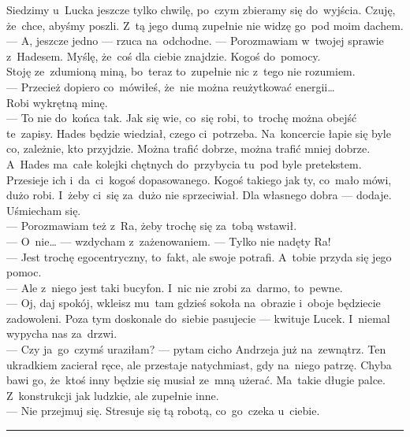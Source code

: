 \documentclass[9pt, a5paper]{memoir}
\begin{document}
Siedzimy u~Lucka jeszcze tylko chwilę, po~czym zbieramy się do~wyjścia. Czuję, że~chce, abyśmy poszli. Z~tą jego dumą zupełnie nie widzę go~pod moim dachem.\\
--- A, jeszcze jedno --- rzuca na~odchodne. --- Porozmawiam w~twojej sprawie z~Hadesem. Myślę, że~coś dla ciebie znajdzie. Kogoś do~pomocy.\\
Stoję ze~zdumioną miną, bo~teraz to~zupełnie nic z~tego nie rozumiem.\\
--- Przecież dopiero co~mówiłeś, że~nie można reużytkować energii\dots\\
Robi wykrętną minę.\\
--- To nie do~końca tak. Jak się wie, co~się robi, to~trochę można obejść te~zapisy. Hades będzie wiedział, czego ci~potrzeba. Na~koncercie łapie się byle co, zależnie, kto przyjdzie. Można trafić dobrze, można trafić mniej dobrze. A~Hades ma~całe kolejki chętnych do~przybycia tu~pod byle pretekstem. Przesieje ich i~da~ci~kogoś dopasowanego. Kogoś takiego jak ty, co~mało mówi, dużo robi. I~żeby ci~się za~dużo nie sprzeciwiał. Dla własnego dobra --- dodaje.\\
Uśmiecham się.\\
--- Porozmawiam też z~Ra, żeby trochę się za~tobą wstawił.\\
--- O~nie\dots{} --- wzdycham z~zażenowaniem. --- Tylko nie nadęty Ra!\\
--- Jest trochę egocentryczny, to~fakt, ale swoje potrafi. A~tobie przyda się jego pomoc.\\
--- Ale z~niego jest taki bucyfon. I~nic nie zrobi za~darmo, to~pewne.\\
--- Oj, daj spokój, wkleisz mu~tam gdzieś sokoła na~obrazie i~oboje będziecie zadowoleni. Poza tym doskonale do~siebie pasujecie --- kwituje Lucek. I~niemal wypycha nas za~drzwi.\\
--- Czy ja~go~czymś uraziłam? --- pytam cicho Andrzeja już na~zewnątrz. Ten ukradkiem zacierał ręce, ale przestaje natychmiast, gdy na~niego patrzę. Chyba bawi go, że~ktoś inny będzie się musiał ze~mną użerać. Ma~takie długie palce. Z~konstrukcji jak ludzkie, ale zupełnie inne.\\
--- Nie przejmuj się. Stresuje się tą robotą, co~go~czeka u~ciebie.

\fancybreak{* \quad * \quad *}
\end{document}
